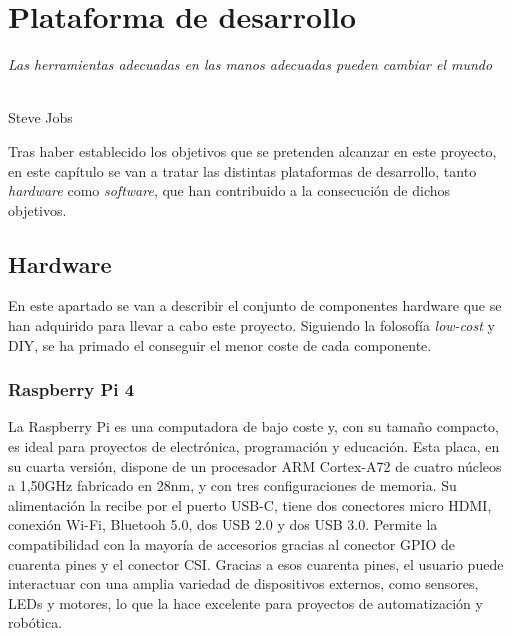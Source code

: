 \chapter{Plataforma de desarrollo}
\label{cap:capitulo4}

\begin{flushright}
\begin{minipage}[]{10cm}
\emph{Las herramientas adecuadas en las manos adecuadas pueden cambiar el mundo}\\
\end{minipage}\\

Steve Jobs\\
\end{flushright}

\vspace{1cm}

Tras haber establecido los objetivos que se pretenden alcanzar en este proyecto, en este capítulo se van a tratar las distintas plataformas de desarrollo, tanto \textit{hardware} como \textit{software}, que han contribuido a la consecución de dichos objetivos.

\section{Hardware}

En este apartado se van a describir el conjunto de componentes hardware que se han adquirido para llevar a cabo este proyecto. Siguiendo la folosofía \textit{low-cost} y \ac{DIY}, se ha primado el conseguir el menor coste de cada componente.

\subsection{Raspberry Pi 4}

La Raspberry Pi es una computadora de bajo coste y, con su tamaño compacto, es ideal para proyectos de electrónica, programación y educación. Esta placa, en su cuarta versión, dispone de un procesador ARM Cortex-A72 de cuatro núcleos a 1,50GHz fabricado en 28nm, y con tres configuraciones de memoria. Su alimentación la recibe por el puerto USB-C, tiene dos conectores micro HDMI, conexión Wi-Fi, Bluetooh 5.0, dos USB 2.0 y dos USB 3.0. Permite la compatibilidad con la mayoría de accesorios gracias al conector GPIO de cuarenta pines y el conector \ac{CSI}. Gracias a esos cuarenta pines, el usuario puede interactuar con una amplia variedad de dispositivos externos, como sensores, LEDs y motores, lo que la hace excelente para proyectos de automatización y robótica. 


